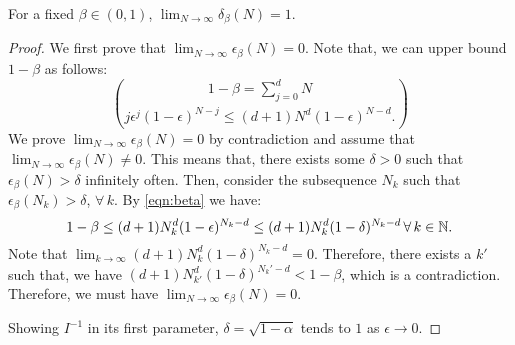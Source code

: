 \begin{corollary}For a fixed $\beta \in (0,1)$, $\lim_{N \to \infty} \delta_\beta(N) = 1$.
\end{corollary}

\begin{proof} 
We first prove that $\lim_{N \to \infty} \epsilon_\beta(N) = 0$. Note that, we can upper bound $1-\beta$ as follows:
\begin{equation}\label{eqn:beta}1-\beta = \sum_{j=0}^d {N}\choose{j} \epsilon^j (1-\epsilon)^{N-j} \leq  (d+1)N^d (1-\epsilon)^{N-d}.
\end{equation}
We prove $\lim_{N \to \infty} \epsilon_\beta(N) = 0$ by contradiction and assume that $\lim_{N \to \infty} \epsilon_\beta(N) \not= 0$. This means that, there exists some $\delta > 0$ such that $\epsilon_\beta(N) > \delta$ infinitely often. Then, consider the subsequence $N_k$ such that $\epsilon_\beta(N_k) > \delta$, $\forall\, k.$ By \eqref{eqn:beta} we have:
\begin{equation*}1-\beta \leq (d+1)N_k^d (1-\epsilon)^{N_k-d} \leq (d+1)N_k^d (1-\delta)^{N_k-d}\, \forall\,k \in \mathbb{N}. 
\end{equation*}
Note that $\lim_{k \to \infty}(d+1)N_k^d (1-\delta)^{N_k-d} = 0.$ Therefore, there exists a $k'$ such that, we have $ (d+1)N_{k'}^d (1-\delta)^{N_k'-d} < 1 -\beta$, which is a contradiction. Therefore, we must have  $\lim_{N \to \infty} \epsilon_\beta(N) = 0$.

Showing $I^{-1}$ in its first parameter, $\delta = \sqrt{1-\alpha}$ tends to $1$ as $\epsilon \to 0$.

\end{proof}

